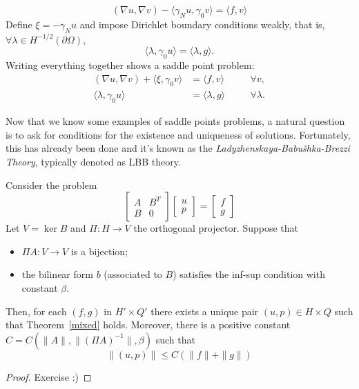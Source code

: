\begin{itemize}
\begin{equation}
        (\nabla u, \nabla v) - \langle \gamma_N u, \gamma_0 v \rangle = \langle f,v \rangle
    \end{equation}
    Define $\xi = -\gamma_N u$ and impose Dirichlet boundary conditions weakly, that is, $\forall \lambda \in H^{-1/2}(\partial\Omega)$,
    \begin{equation}
         \langle \lambda, \gamma_0 u \rangle = \langle \lambda, g \rangle.
    \end{equation}
    Writing everything together shows a saddle point problem:
    \begin{equation}
        \begin{aligned}
            (\nabla u, \nabla v) + \langle \xi, \gamma_0 v \rangle &= \langle f,v \rangle &&\quad \forall v,\\ 
            \langle \lambda, \gamma_0 u \rangle &= \langle \lambda, g \rangle &&\quad  \forall \lambda.
        \end{aligned}
    \end{equation}
\end{itemize}

Now that we know some examples of saddle points problems, a natural question is to ask for conditions for the existence and uniqueness of solutions. Fortunately, this has already been done and it's known as the \emph{Ladyzhenskaya-Babu\v{s}hka-Brezzi Theory}, typically denoted as LBB theory.
\begin{theorem}
    Consider the problem
    \begin{equation*}\label{mixed}
        \begin{bmatrix}
            A & B^{T}\\ 
            B & 0
        \end{bmatrix}
        \begin{bmatrix}
            u \\ p
        \end{bmatrix}
        =
        \begin{bmatrix}
            f \\ g
        \end{bmatrix}
    \end{equation*}
    Let $V = \ker B$ and $\Pi\colon H\to V$ the orthogonal projector. Suppose that
    \begin{itemize}
        \item $\Pi A\colon V\to V$ is a bijection;
        \item the bilinear form $b$ (associated to $B$) satisfies the inf-sup condition with constant $\beta$.
    \end{itemize}
    Then, for each $(f,g)$ in $H'\times Q'$ there exists a unique pair $(u,p)\in H\times Q$ such that Theorem~\eqref{mixed} holds. Moreover, there is a positive constant $C=C(\|A\|, \| (\Pi A)^{-1}\|, \beta)$ such that
    \begin{equation*}
        \| (u,p) \| \le C \left( \|f\| + \|g\| \right) 
    \end{equation*}
    \begin{proof}
        Exercise :)
    \end{proof}
\end{theorem}

